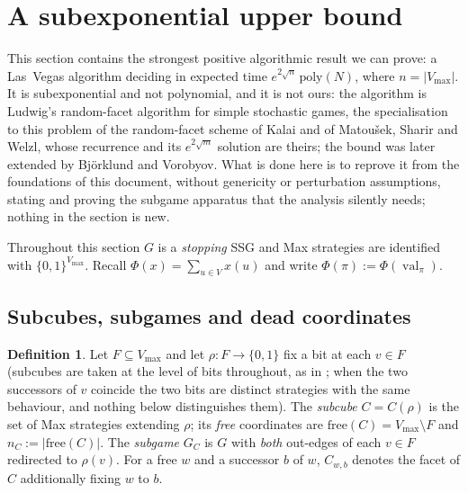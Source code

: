 \documentclass[11pt]{article}
\theoremstyle{plain}
\theoremstyle{definition}
\newtheorem{definition}[theorem]{Definition}
\DeclareMathOperator{\val}{val}
\newcommand{\Vmax}{V_{\max}}
\begin{document}
\section{A subexponential upper bound}\label{sec:randomfacet}

This section contains the strongest positive algorithmic result we can
prove: a Las~Vegas algorithm deciding  in expected time
$e^{2\sqrt n}\,\mathrm{poly}(N)$, where $n=|\Vmax|$. It is subexponential
and not polynomial, and it is not ours: the algorithm is Ludwig's
random-facet algorithm for simple stochastic games, the specialisation to
this problem of the random-facet scheme of Kalai and of Matou\v{s}ek,
Sharir and Welzl, whose recurrence  and its $e^{2\sqrt m}$
solution  are theirs; the bound was later extended by
Bj\"orklund and Vorobyov. What is done here is to reprove it from the
foundations of this document, without genericity or perturbation
assumptions, stating and proving the subgame apparatus that the analysis
silently needs; nothing in the section is new.

Throughout this section $G$ is a \emph{stopping} SSG and Max strategies
are identified with $\{0,1\}^{\Vmax}$. Recall $\Phi(x)=\sum_{u\in V}x(u)$
and write $\Phi(\pi):=\Phi(\val_\pi)$.

\subsection{Subcubes, subgames and dead coordinates}

\begin{definition}\label{def:subcube}
Let $F\subseteq\Vmax$ and let $\rho:F\to\{0,1\}$ fix a bit at each $v\in F$
(subcubes are taken at the level of bits throughout, as in
; when the two successors of $v$ coincide the two bits
are distinct strategies with the same behaviour, and nothing below
distinguishes them). The \emph{subcube} $C=C(\rho)$ is the set of Max
strategies extending $\rho$; its \emph{free} coordinates are
$\mathrm{free}(C)=\Vmax\setminus F$ and $n_C:=|\mathrm{free}(C)|$. The
\emph{subgame} $G_C$ is $G$ with \emph{both} out-edges of each $v\in F$
redirected to $\rho(v)$. For a free $w$ and a successor $b$ of $w$,
$C_{w,b}$ denotes the facet of $C$ additionally fixing $w$ to $b$.
\end{definition}
\end{document}
